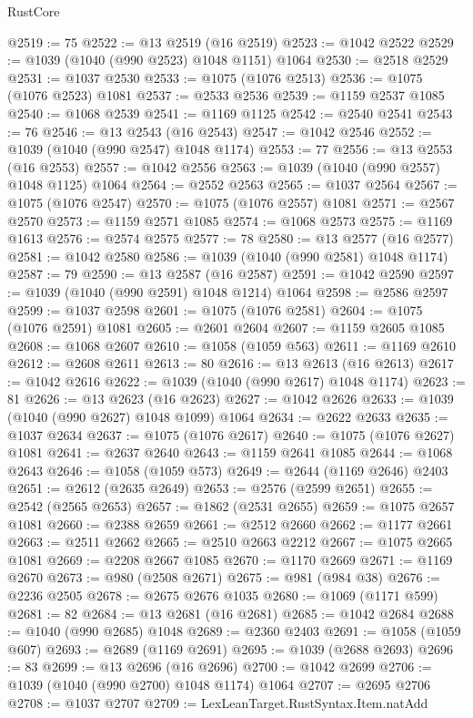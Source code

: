 \begin{lexlean}{RustCore}
\begin{coremodule}
@2519 := 75
@2522 := @13 @2519 (@16 @2519)
@2523 := @1042 @2522
@2529 := @1039 (@1040 (@990 @2523) @1048 @1151) @1064
@2530 := @2518 @2529
@2531 := @1037 @2530
@2533 := @1075 (@1076 @2513)
@2536 := @1075 (@1076 @2523) @1081
@2537 := @2533 @2536
@2539 := @1159 @2537 @1085
@2540 := @1068 @2539
@2541 := @1169 @1125
@2542 := @2540 @2541
@2543 := 76
@2546 := @13 @2543 (@16 @2543)
@2547 := @1042 @2546
@2552 := @1039 (@1040 (@990 @2547) @1048 @1174)
@2553 := 77
@2556 := @13 @2553 (@16 @2553)
@2557 := @1042 @2556
@2563 := @1039 (@1040 (@990 @2557) @1048 @1125) @1064
@2564 := @2552 @2563
@2565 := @1037 @2564
@2567 := @1075 (@1076 @2547)
@2570 := @1075 (@1076 @2557) @1081
@2571 := @2567 @2570
@2573 := @1159 @2571 @1085
@2574 := @1068 @2573
@2575 := @1169 @1613
@2576 := @2574 @2575
@2577 := 78
@2580 := @13 @2577 (@16 @2577)
@2581 := @1042 @2580
@2586 := @1039 (@1040 (@990 @2581) @1048 @1174)
@2587 := 79
@2590 := @13 @2587 (@16 @2587)
@2591 := @1042 @2590
@2597 := @1039 (@1040 (@990 @2591) @1048 @1214) @1064
@2598 := @2586 @2597
@2599 := @1037 @2598
@2601 := @1075 (@1076 @2581)
@2604 := @1075 (@1076 @2591) @1081
@2605 := @2601 @2604
@2607 := @1159 @2605 @1085
@2608 := @1068 @2607
@2610 := @1058 (@1059 @563)
@2611 := @1169 @2610
@2612 := @2608 @2611
@2613 := 80
@2616 := @13 @2613 (@16 @2613)
@2617 := @1042 @2616
@2622 := @1039 (@1040 (@990 @2617) @1048 @1174)
@2623 := 81
@2626 := @13 @2623 (@16 @2623)
@2627 := @1042 @2626
@2633 := @1039 (@1040 (@990 @2627) @1048 @1099) @1064
@2634 := @2622 @2633
@2635 := @1037 @2634
@2637 := @1075 (@1076 @2617)
@2640 := @1075 (@1076 @2627) @1081
@2641 := @2637 @2640
@2643 := @1159 @2641 @1085
@2644 := @1068 @2643
@2646 := @1058 (@1059 @573)
@2649 := @2644 (@1169 @2646) @2403
@2651 := @2612 (@2635 @2649)
@2653 := @2576 (@2599 @2651)
@2655 := @2542 (@2565 @2653)
@2657 := @1862 (@2531 @2655)
@2659 := @1075 @2657 @1081
@2660 := @2388 @2659
@2661 := @2512 @2660
@2662 := @1177 @2661
@2663 := @2511 @2662
@2665 := @2510 @2663 @2212
@2667 := @1075 @2665 @1081
@2669 := @2208 @2667 @1085
@2670 := @1170 @2669
@2671 := @1169 @2670
@2673 := @980 (@2508 @2671)
@2675 := @981 (@984 @38)
@2676 := @2236 @2505
@2678 := @2675 @2676 @1035
@2680 := @1069 (@1171 @599)
@2681 := 82
@2684 := @13 @2681 (@16 @2681)
@2685 := @1042 @2684
@2688 := @1040 (@990 @2685) @1048
@2689 := @2360 @2403
@2691 := @1058 (@1059 @607)
@2693 := @2689 (@1169 @2691)
@2695 := @1039 (@2688 @2693)
@2696 := 83
@2699 := @13 @2696 (@16 @2696)
@2700 := @1042 @2699
@2706 := @1039 (@1040 (@990 @2700) @1048 @1174) @1064
@2707 := @2695 @2706
@2708 := @1037 @2707
@2709 := LexLeanTarget.RustSyntax.Item.natAdd

\end{coremodule}
\end{lexlean}
